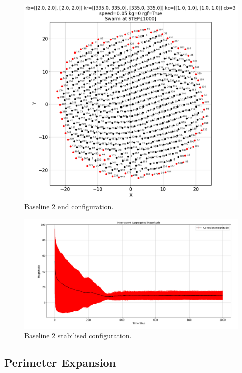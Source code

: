\documentclass[12pt,a4paper]{IEEEtran}
\begin{document}
\begin{figure}[H]
	\begin{center}
		\includegraphics[width=1.0\linewidth]{figures/baseline2-2}
	\end{center}
	\caption{Baseline 2 end configuration. \label{fig:baseline2-2}}
\end{figure}

\begin{figure}[H]
	\begin{center}
		\includegraphics[width=1.0\linewidth]{figures/baseline2Magnitude}
	\end{center}
	\caption{Baseline 2 stabilised configuration. \label{fig:baseline2Magnitude}}
\end{figure}

\subsection{Perimeter Expansion}
\end{document}
